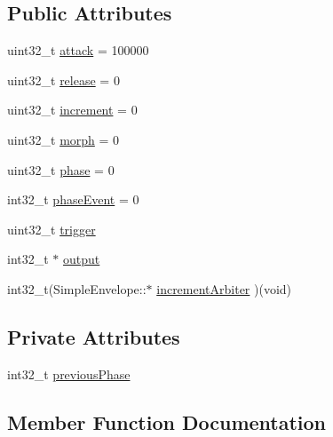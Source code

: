 \subsection*{Public Attributes}
\begin{DoxyCompactItemize}
\item 
uint32\+\_\+t \mbox{\hyperlink{class_simple_envelope_acc118c5a74cb3373b48853916de74ce1}{attack}} = 100000
\item 
uint32\+\_\+t \mbox{\hyperlink{class_simple_envelope_a0776a9109e91358cc570b639e9437081}{release}} = 0
\item 
uint32\+\_\+t \mbox{\hyperlink{class_simple_envelope_a67a284db902cdd8ea5a98534ee98919d}{increment}} = 0
\item 
uint32\+\_\+t \mbox{\hyperlink{class_simple_envelope_ad17757bb65fb92738039ab3b2c491598}{morph}} = 0
\item 
uint32\+\_\+t \mbox{\hyperlink{class_simple_envelope_a20f0e52c5fb52d053229ae138486b11a}{phase}} = 0
\item 
int32\+\_\+t \mbox{\hyperlink{class_simple_envelope_a3d9297ae4a3058743fb0311d698015e4}{phase\+Event}} = 0
\item 
uint32\+\_\+t \mbox{\hyperlink{class_simple_envelope_a1de4ca7380abf92d8e7d1a2643e0e20d}{trigger}}
\item 
int32\+\_\+t $\ast$ \mbox{\hyperlink{class_simple_envelope_ad24a3971ec80b61538def41baaea4203}{output}}
\item 
int32\+\_\+t(Simple\+Envelope\+::$\ast$ \mbox{\hyperlink{class_simple_envelope_a9142a7c1dad70d38081b5bf5f36a0bf2}{increment\+Arbiter}} )(void)
\end{DoxyCompactItemize}
\subsection*{Private Attributes}
\begin{DoxyCompactItemize}
\item 
int32\+\_\+t \mbox{\hyperlink{class_simple_envelope_aa31e875f02278ee2d62fc38773bb1399}{previous\+Phase}}
\end{DoxyCompactItemize}


\subsection{Member Function Documentation}
\mbox{\label{class_simple_envelope_a4d0202e556234d3c967644fd1bea6fff}} 
